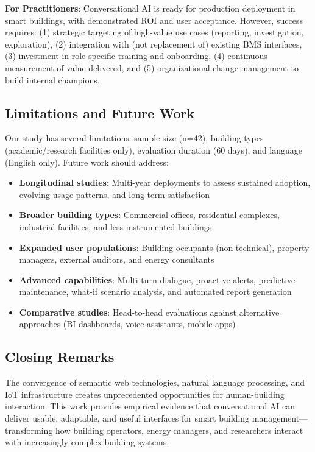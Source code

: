 \documentclass[acmlarge]{acmart}
\begin{document}
\textbf{For Practitioners}: Conversational AI is ready for production deployment in smart buildings, with demonstrated ROI and user acceptance. However, success requires: (1) strategic targeting of high-value use cases (reporting, investigation, exploration), (2) integration with (not replacement of) existing BMS interfaces, (3) investment in role-specific training and onboarding, (4) continuous measurement of value delivered, and (5) organizational change management to build internal champions.

\subsection{Limitations and Future Work}

Our study has several limitations: sample size (n=42), building types (academic/research facilities only), evaluation duration (60 days), and language (English only). Future work should address:

\begin{itemize}
    \item \textbf{Longitudinal studies}: Multi-year deployments to assess sustained adoption, evolving usage patterns, and long-term satisfaction
    \item \textbf{Broader building types}: Commercial offices, residential complexes, industrial facilities, and less instrumented buildings
    \item \textbf{Expanded user populations}: Building occupants (non-technical), property managers, external auditors, and energy consultants
    \item \textbf{Advanced capabilities}: Multi-turn dialogue, proactive alerts, predictive maintenance, what-if scenario analysis, and automated report generation
    \item \textbf{Comparative studies}: Head-to-head evaluations against alternative approaches (BI dashboards, voice assistants, mobile apps)
\end{itemize}


\subsection{Closing Remarks}

The convergence of semantic web technologies, natural language processing, and IoT infrastructure creates unprecedented opportunities for human-building interaction. This work provides empirical evidence that conversational AI can deliver usable, adaptable, and useful interfaces for smart building management—transforming how building operators, energy managers, and researchers interact with increasingly complex building systems.
\end{document}
